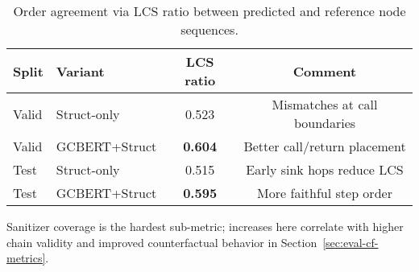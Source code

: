 \documentclass{buthesis}
\begin{document}
\begin{table}[H]
\centering
\small
\setlength{\tabcolsep}{1pt} %
\renewcommand{\arraystretch}{1.12}
\caption{Role and order agreement with ground truth. Coverage computed on positive test items with reference chains.}
\label{tab:role-order}
\end{table}




\begin{table}[H]
\centering
\small
\setlength{\tabcolsep}{10pt}
\renewcommand{\arraystretch}{1.10}
\caption{Order agreement via LCS ratio between predicted and reference node sequences.}
\label{tab:lcs}
\begin{tabular}{l l c c}
\toprule
\textbf{Split} & \textbf{Variant} & \textbf{LCS ratio} & \textbf{Comment} \\
\midrule
Valid & Struct-only        & 0.523 & Mismatches at call boundaries \\
Valid & GCBERT{+}Struct   & \textbf{0.604} & Better call/return placement \\
Test  & Struct-only        & 0.515 & Early sink hops reduce LCS \\
Test  & GCBERT{+}Struct   & \textbf{0.595} & More faithful step order \\
\bottomrule
\end{tabular}
\end{table}

\noindent
Sanitizer coverage is the hardest sub-metric; increases here correlate with higher chain validity and improved counterfactual behavior in Section~\ref{sec:eval-cf-metrics}.
\end{document}
